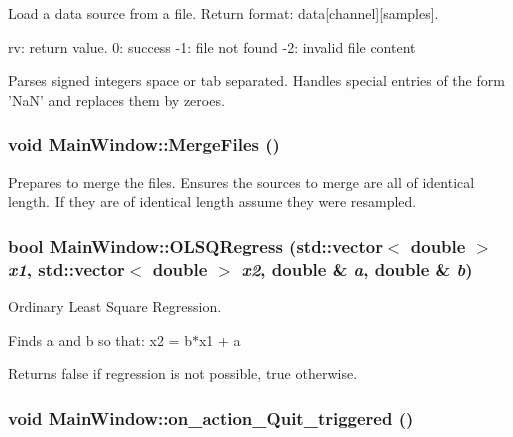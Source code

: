Load a data source from a file. Return format: data\mbox{[}channel\mbox{]}\mbox{[}samples\mbox{]}. 

rv: return value. 0: success -1: file not found -2: invalid file content

Parses signed integers space or tab separated. Handles special entries of the form 'NaN' and replaces them by zeroes. \hypertarget{class_main_window_69efbc03c395ff2912037572ba655f6e}{
\subsubsection[{MergeFiles}]{\setlength{\rightskip}{0pt plus 5cm}void MainWindow::MergeFiles ()}}
\label{class_main_window_69efbc03c395ff2912037572ba655f6e}


Prepares to merge the files. Ensures the sources to merge are all of identical length. If they are of identical length assume they were resampled. 

\hypertarget{class_main_window_20833bb123708ce4d1bd33b22de1f057}{
\subsubsection[{OLSQRegress}]{\setlength{\rightskip}{0pt plus 5cm}bool MainWindow::OLSQRegress (std::vector$<$ double $>$ {\em x1}, \/  std::vector$<$ double $>$ {\em x2}, \/  double \& {\em a}, \/  double \& {\em b})}}
\label{class_main_window_20833bb123708ce4d1bd33b22de1f057}


Ordinary Least Square Regression. 

Finds a and b so that: x2 = b$\ast$x1 + a

Returns false if regression is not possible, true otherwise. \hypertarget{class_main_window_0b8c6952362faeeee64487be46b5ae6d}{
\subsubsection[{on\_\-action\_\-Quit\_\-triggered}]{\setlength{\rightskip}{0pt plus 5cm}void MainWindow::on\_\-action\_\-Quit\_\-triggered ()}}
\label{class_main_window_0b8c6952362faeeee64487be46b5ae6d}


